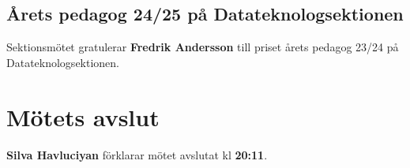 \documentclass{datateknologsektionen-document}
\begin{document}
\subsection{Årets pedagog 24/25 på Datateknologsektionen}

Sektionsmötet gratulerar \textbf{Fredrik Andersson} till priset årets pedagog 23/24 på Datateknologsektionen.

\section{Mötets avslut}

\textbf{Silva Havluciyan} förklarar mötet avslutat kl \textbf{20:11}.

\end{document}
